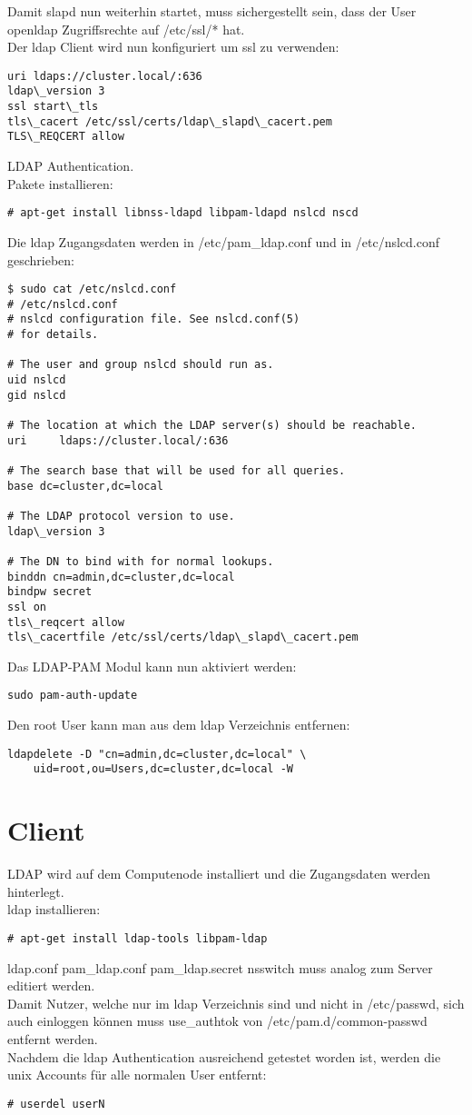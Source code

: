 Damit slapd nun weiterhin startet, muss sichergestellt sein, dass der User openldap Zugriffsrechte auf /etc/ssl/* hat.\\
Der ldap Client wird nun konfiguriert um ssl zu verwenden:
\begin{lstlisting}[style=Bash]
uri ldaps://cluster.local/:636
ldap\_version 3
ssl start\_tls
tls\_cacert /etc/ssl/certs/ldap\_slapd\_cacert.pem
TLS\_REQCERT allow
\end{lstlisting}
LDAP Authentication.\\
Pakete installieren:
\begin{lstlisting}[style=Bash]
# apt-get install libnss-ldapd libpam-ldapd nslcd nscd
\end{lstlisting}
Die ldap Zugangsdaten werden in /etc/pam\_ldap.conf und in /etc/nslcd.conf geschrieben:
\begin{lstlisting}[style=Bash]
$ sudo cat /etc/nslcd.conf 
# /etc/nslcd.conf
# nslcd configuration file. See nslcd.conf(5)
# for details.

# The user and group nslcd should run as.
uid nslcd
gid nslcd

# The location at which the LDAP server(s) should be reachable.
uri     ldaps://cluster.local/:636

# The search base that will be used for all queries.
base dc=cluster,dc=local

# The LDAP protocol version to use.
ldap\_version 3

# The DN to bind with for normal lookups.
binddn cn=admin,dc=cluster,dc=local
bindpw secret
ssl on
tls\_reqcert allow
tls\_cacertfile /etc/ssl/certs/ldap\_slapd\_cacert.pem
\end{lstlisting}
Das LDAP-PAM Modul kann nun aktiviert werden: 
\begin{lstlisting}[style=Bash]
sudo pam-auth-update
\end{lstlisting}
Den root User kann man aus dem ldap Verzeichnis entfernen:
\begin{lstlisting}[style=Bash]
ldapdelete -D "cn=admin,dc=cluster,dc=local" \
	uid=root,ou=Users,dc=cluster,dc=local -W
\end{lstlisting}
\section{Client}
LDAP wird auf dem Computenode installiert und die Zugangsdaten werden hinterlegt.\\
ldap installieren:
\begin{lstlisting}[style=Bash]
# apt-get install ldap-tools libpam-ldap
\end{lstlisting}
{ldap.conf pam\_ldap.conf pam\_ldap.secret nsswitch} muss analog zum Server editiert werden.\\
Damit Nutzer, welche nur im ldap Verzeichnis sind und nicht in /etc/passwd, sich auch einloggen können muss use\_authtok von /etc/pam.d/common-passwd entfernt werden.\\
Nachdem die ldap Authentication ausreichend getestet worden ist, werden die unix Accounts für alle normalen User entfernt: 
\begin{lstlisting}[style=Bash]
# userdel userN
\end{lstlisting}

